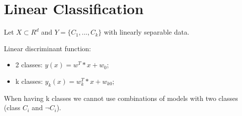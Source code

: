 \section{Linear Classification}

Let $X \subset R^d$ and $Y = \{C_1, ..., C_k\}$ with linearly separable data.

Linear discriminant function:
\begin{itemize}
    \item 2 classes: $y(x) = w^T*x + w_0$;
    \item k classes: $y_k(x) = w_k^T*x + w_{k0}$;
\end{itemize}

When having k classes we cannot use combinations of models with two classes (class $C_i$ and $\lnot C_i$).
